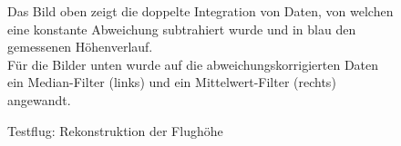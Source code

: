 \begin{figure}[ht!]
\vspace{0.25cm}
\begin{center}
\caption{Testflug: Rekonstruktion der Flughöhe}
\label{fig:FlightHeightReconst}
\end{center}

\vspace{0.25cm}
Das Bild oben zeigt die doppelte Integration von Daten, von welchen eine konstante Abweichung subtrahiert wurde und in blau den gemessenen Höhenverlauf.\\
Für die Bilder unten wurde auf die abweichungskorrigierten Daten ein Median-Filter (links) und ein Mittelwert-Filter (rechts) angewandt.
\end{figure}












